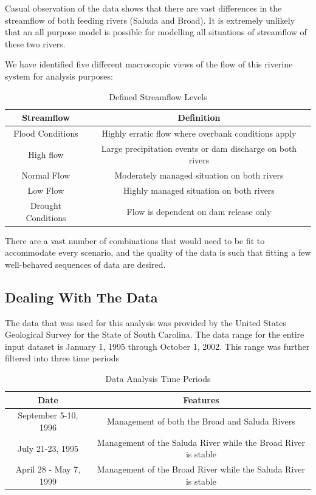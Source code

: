 \documentclass[12pt]{report}
\begin{document}
Casual observation of the data shows that there are vast
differences in the streamflow of both feeding rivers (Saluda and
Broad).  It is extremely unlikely that an all purpose model is
possible for modelling all situations of streamflow of these two
rivers.

We have identified five different macroscopic views of the flow of
this riverine system for analysis purposes:
\begin{table}[h]
\begin{tabular}{|c|c|} \hline
 \textbf{Streamflow} & \textbf{Definition} \\
  \hline
Flood Conditions & Highly erratic flow where overbank conditions
apply\\
High flow & Large precipitation events or dam discharge on both
rivers\\
Normal Flow & Moderately managed situation on both rivers\\
Low Flow & Highly managed situation on both rivers\\
Drought Conditions & Flow is dependent on dam release only\\
\hline
\end{tabular}\caption{Defined Streamflow Levels}\label{tab:SFCond}
\end{table}

There are a vast number of combinations that would need to be fit
to accommodate every scenario, and the quality of the data is such
that fitting a few well-behaved sequences of data are desired.

\subsection{Dealing With The Data} The data that was used for this
analysis was provided by the United States Geological Survey for
the State of South Carolina.  The data range for the entire input
dataset is January 1, 1995 through October 1, 2002.  This range
was further filtered into three time periods
\begin{table}[h]
\begin{tabular}{|c|c|} \hline
\textbf{Date} & \textbf{Features} \\
\hline
September 5-10, 1996 &
Management of both the Broad and Saluda
Rivers \\
July 21-23, 1995 & Management of the Saluda River while the Broad
River is stable \\
April 28 - May 7, 1999 & Management of the Broad River while the
Saluda River is stable \\
\hline
\end{tabular}\caption{Data Analysis Time Periods}
\end{table}
\end{document}
